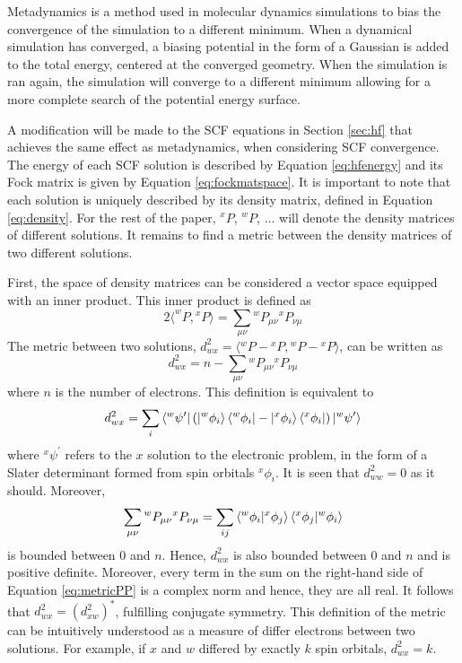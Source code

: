 \documentclass[final,3p,times,twocolumn]{elsarticle}
\begin{document}
Metadynamics is a method used in molecular dynamics simulations to bias the convergence of the simulation to a different minimum.\cite{parrinello-2002} When a dynamical simulation has converged, a biasing potential in the form of a Gaussian is added to the total energy, centered at the converged geometry. When the simulation is ran again, the simulation will converge to a different minimum allowing for a more complete search of the potential energy surface.

A modification will be made to the SCF equations in Section \ref{sec:hf} that achieves the same effect as metadynamics, when considering SCF convergence. The energy of each SCF solution is described by Equation \eqref{eq:hfenergy} and its Fock matrix is given by Equation \eqref{eq:fockmatspace}. It is important to note that each solution is uniquely described by its density matrix, defined in Equation \eqref{eq:density}. For the rest of the paper, $^xP$, $^wP$, $\ldots$ will denote the density matrices of different solutions. It remains to find a metric between the density matrices of two different solutions. 

First, the space of density matrices can be considered a vector space equipped with an inner product. This inner product is defined as
\begin{equation} \label{eq:innerproduct}
2\langle ^wP,{}^xP \rangle = \sum_{\mu\nu}{}^wP_{\mu\nu}{}^xP_{\nu\mu}
\end{equation}
The metric between two solutions, $d_{wx}^2 = \langle {}^wP - {}^xP, {}^wP - {}^xP \rangle$, can be written as
\begin{equation} \label{eq:metric}
d_{wx}^2 = n - \sum_{\mu\nu}{}^wP_{\mu\nu}{}^xP_{\nu\mu}
\end{equation}
where $n$ is the number of electrons. This definition is equivalent to
\begin{equation}
d_{wx}^2 = \sum_i \bra{{}^w\psi^\prime} (\ket{{}^w\phi_i}\bra{{}^w\phi_i} - \ket{{}^x\phi_i}\bra{{}^x\phi_i}) \ket{{}^w\psi^\prime}
\end{equation}
where ${}^x\psi^\prime$ refers to the $x$ solution to the electronic problem, in the form of a Slater determinant formed from spin orbitals $^x\phi_i$. It is seen that $d_{ww}^2 = 0$ as it should. Moreover, 
\begin{equation} \label{eq:metricPP}
\sum_{\mu\nu}{}^wP_{\mu\nu}{}^xP_{\nu\mu} = \sum_{ij} \bra{^w\phi_i}\ket{^x\phi_j}\bra{^x\phi_j}\ket{^w\phi_i}
\end{equation}
is bounded between 0 and $n$. Hence, $d_{wx}^2$ is also bounded between 0 and $n$ and is positive definite. Moreover, every term in the sum on the right-hand side of Equation \eqref{eq:metricPP} is a complex norm and hence, they are all real. It follows that $d_{wx}^2 = (d_{xw}^2)^*$, fulfilling conjugate symmetry. This definition of the metric can be intuitively understood as a measure of differ electrons between two solutions. For example, if $x$ and $w$ differed by exactly $k$ spin orbitals, $d_{wx}^2 = k$. 
\end{document}
